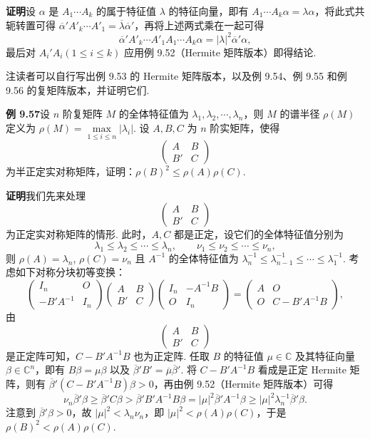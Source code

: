 \documentclass[UTF8, 12pt, fontset=fandol, oneside]{ctexart}
\begin{document}
\noindent\textbf{证明}\quad 设 $\alpha$ 是 $A_1\cdots A_k$ 的属于特征值 $\lambda$ 的特征向量，即有 $A_1\cdots A_k\alpha=\lambda\alpha$，将此式共轭转置可得 $\overline{\alpha}'A'_k\cdots A'_1=\overline{\lambda}\overline{\alpha}'$，再将上述两式乘在一起可得
\[
\overline{\alpha}'A'_k\cdots A'_1A_1\cdots A_k\alpha=|\lambda|^2\overline{\alpha}'\alpha,
\]
最后对 $A_i'A_i(1\le i\le k)$ 应用例 9.52（Hermite 矩阵版本）即得结论.

注\quad 读者可以自行写出例 9.53 的 Hermite 矩阵版本，以及例 9.54、例 9.55 和例 9.56 的复矩阵版本，并证明它们.

\noindent\textbf{例 9.57}\quad 设 $n$ 阶复矩阵 $M$ 的全体特征值为 $\lambda_1,\lambda_2,\cdots,\lambda_n$，则 $M$ 的谱半径 $\rho(M)$ 定义为 $\rho(M)=\max\limits_{1\le i\le n}|\lambda_i|$. 设 $A,B,C$ 为 $n$ 阶实矩阵，使得
\[
\begin{pmatrix}
A&B\\
B'&C
\end{pmatrix}
\]
为半正定实对称矩阵，证明：$\rho(B)^2\le\rho(A)\rho(C)$.

\noindent\textbf{证明}\quad 我们先来处理
\[
\begin{pmatrix}
A&B\\
B'&C
\end{pmatrix}
\]
为正定实对称矩阵的情形. 此时，$A,C$ 都是正定，设它们的全体特征值分别为
\[
\lambda_1\le\lambda_2\le\cdots\le\lambda_n,\qquad
\nu_1\le\nu_2\le\cdots\le\nu_n,
\]
则 $\rho(A)=\lambda_n$, $\rho(C)=\nu_n$ 且 $A^{-1}$ 的全体特征值为 $\lambda_n^{-1}\le\lambda_{n-1}^{-1}\le\cdots\le\lambda_1^{-1}$. 考虑如下对称分块初等变换：
\[
\begin{pmatrix}
I_n&O\\
-B'A^{-1}&I_n
\end{pmatrix}
\begin{pmatrix}
A&B\\
B'&C
\end{pmatrix}
\begin{pmatrix}
I_n&-A^{-1}B\\
O&I_n
\end{pmatrix}
=
\begin{pmatrix}
A&O\\
O&C-B'A^{-1}B
\end{pmatrix},
\]
由
\[
\begin{pmatrix}
A&B\\
B'&C
\end{pmatrix}
\]
是正定阵可知，$C-B'A^{-1}B$ 也为正定阵. 任取 $B$ 的特征值 $\mu\in\mathbb{C}$ 及其特征向量 $\beta\in\mathbb{C}^n$，即有 $B\beta=\mu\beta$ 以及 $\overline{\beta}'B'=\overline{\mu}\overline{\beta}'$. 将 $C-B'A^{-1}B$ 看成是正定 Hermite 矩阵，则有 $\overline{\beta}'(C-B'A^{-1}B)\beta>0$，再由例 9.52（Hermite 矩阵版本）可得
\[
\nu_n\overline{\beta}'\beta\ge\overline{\beta}'C\beta>\overline{\beta}'B'A^{-1}B\beta=|\mu|^2\overline{\beta}'A^{-1}\beta\ge|\mu|^2\lambda_n^{-1}\overline{\beta}'\beta.
\]
注意到 $\overline{\beta}'\beta>0$，故 $|\mu|^2<\lambda_n\nu_n$，即 $|\mu|^2<\rho(A)\rho(C)$，于是 $\rho(B)^2<\rho(A)\rho(C)$.
\end{document}
